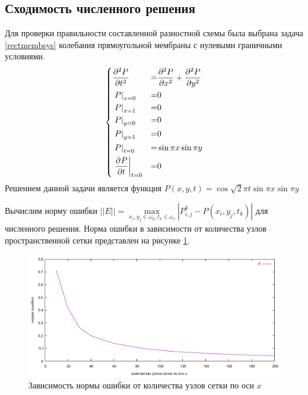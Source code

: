 \documentclass[a4paper, fontsize=14pt]{article}
\begin{document}
\subsection{Сходимость численного решения}
	Для проверки правильности составленной разностной схемы была выбрана задача \ref{rectmembsys} колебания прямоугольной
мембраны с нулевыми граничными условиями.
\begin{equation}
\label{rectmembsys}
	\left\{
	\begin{aligned}
		&\diff[2]{P}{t}          &=& \diff[2]{P}{x} + \diff[2]{P}{y} \\
		&\subs{x=0}{P}           &=& 0\\
		&\subs{x=1}{P}           &=& 0\\
		&\subs{y=0}{P}           &=& 0\\
		&\subs{y=1}{P}           &=& 0\\
		&\subs{t=0}{P}           &=& \sin \pi x \sin \pi y\\
		&\subs{t=0}{\diff{P}{t}} &=& 0\\
	\end{aligned}
	\right.
\end{equation}
Решением данной задачи является функция $P(x,y,t) = \cos \sqrt{2}\pi t \sin \pi x \sin \pi y$

Вычислим норму ошибки $||E|| = \max\limits_{x_i,y_j \in \omega_h, t_k \in
\omega_\tau} |P^k_{i,j} - P(x_i,y_j,t_k)|$ для численного решения. Норма ошибки в зависимости от
количества узлов пространственной сетки представлен на рисунке \ref{errgraph}.
\begin{figure}[h]
	\centering
	\includegraphics[width=1\columnwidth]{err-graph}
	\caption{Зависимость нормы ошибки от количества узлов сетки по оси $x$}
	\label{errgraph}
\end{figure}
\end{document}
